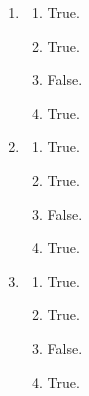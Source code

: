 \documentclass[12pt,a4paper]{article}
\begin{document}
\begin{enumerate}
\begin{enumerate}[label=(\Alph*)]
    \item True.
    \item True.
    \item True.
    \item False.
  \end{enumerate}
  \item \begin{enumerate}[label=(\Alph*)]
    \item True.
    \item True.
    \item False.
    \item True.
  \end{enumerate}
  \item \begin{enumerate}[label=(\Alph*)]
    \item True.
    \item True.
    \item False.
    \item True.
  \end{enumerate}
  \item \begin{enumerate}[label=(\Alph*)]
    \item True.
    \item True.
    \item False.
    \item True.
  \end{enumerate}
\end{enumerate}
\end{document}
